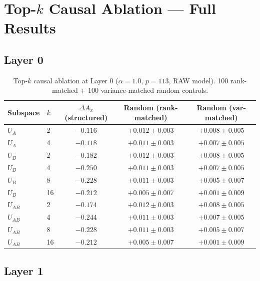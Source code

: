 \documentclass[11pt,a4paper]{article}
\begin{document}
\section{Top-$k$ Causal Ablation --- Full Results}

\subsection{Layer 0}

\begin{table}[h]
\centering
\caption{Top-$k$ causal ablation at Layer 0 ($\alpha = 1.0$, $p=113$, RAW model). 100 rank-matched + 100 variance-matched random controls.}
\begin{tabular}{llccc}
\toprule
Subspace & $k$ & $\Delta A_x$ (structured) & Random (rank-matched) & Random (var-matched) \\
\midrule
$U_A$ & 2 & $-0.116$ & $+0.012 \pm 0.003$ & $+0.008 \pm 0.005$ \\
$U_A$ & 4 & $-0.118$ & $+0.011 \pm 0.003$ & $+0.007 \pm 0.005$ \\
$U_B$ & 2 & $-0.182$ & $+0.012 \pm 0.003$ & $+0.008 \pm 0.005$ \\
$U_B$ & 4 & $-0.250$ & $+0.011 \pm 0.003$ & $+0.007 \pm 0.005$ \\
$U_B$ & 8 & $-0.228$ & $+0.011 \pm 0.003$ & $+0.005 \pm 0.007$ \\
$U_B$ & 16 & $-0.212$ & $+0.005 \pm 0.007$ & $+0.001 \pm 0.009$ \\
$U_{AB}$ & 2 & $-0.174$ & $+0.012 \pm 0.003$ & $+0.008 \pm 0.005$ \\
$U_{AB}$ & 4 & $-0.244$ & $+0.011 \pm 0.003$ & $+0.007 \pm 0.005$ \\
$U_{AB}$ & 8 & $-0.228$ & $+0.011 \pm 0.003$ & $+0.005 \pm 0.007$ \\
$U_{AB}$ & 16 & $-0.212$ & $+0.005 \pm 0.007$ & $+0.001 \pm 0.009$ \\
\bottomrule
\end{tabular}
\end{table}

\subsection{Layer 1}
\end{document}
